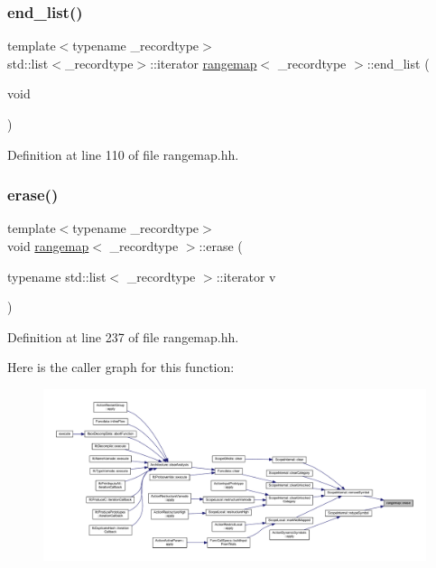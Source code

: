 \subsubsection{\texorpdfstring{end\_list()}{end\_list()}\hspace{0.1cm}{\footnotesize\ttfamily [2/2]}}
{\footnotesize\ttfamily template$<$typename \+\_\+recordtype$>$ \\
std\+::list$<$\+\_\+recordtype$>$\+::iterator \mbox{\hyperlink{classrangemap}{rangemap}}$<$ \+\_\+recordtype $>$\+::end\+\_\+list (\begin{DoxyParamCaption}\item[{void}]{ }\end{DoxyParamCaption})\hspace{0.3cm}{\ttfamily [inline]}}



Definition at line 110 of file rangemap.\+hh.

\mbox{\label{classrangemap_a4acc95dca04c2140d28b0eca719e017d}} 
\subsubsection{\texorpdfstring{erase()}{erase()}\hspace{0.1cm}{\footnotesize\ttfamily [1/2]}}
{\footnotesize\ttfamily template$<$typename \+\_\+recordtype$>$ \\
void \mbox{\hyperlink{classrangemap}{rangemap}}$<$ \+\_\+recordtype $>$\+::erase (\begin{DoxyParamCaption}\item[{typename std\+::list$<$ \+\_\+recordtype $>$\+::iterator}]{v }\end{DoxyParamCaption})}



Definition at line 237 of file rangemap.\+hh.

Here is the caller graph for this function\+:
\nopagebreak
\begin{figure}[H]
\begin{center}
\leavevmode
\includegraphics[width=350pt]{classrangemap_a4acc95dca04c2140d28b0eca719e017d_icgraph}
\end{center}
\end{figure}
\mbox{\label{classrangemap_a5c92c4941f0220511dcb911c0b223211}} 
